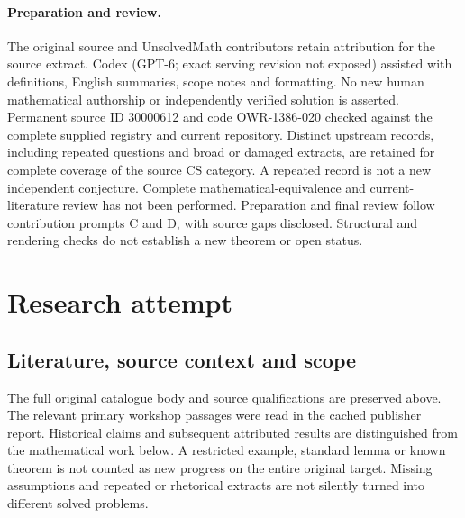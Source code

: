 \documentclass[11pt]{article}
\begin{document}
\paragraph{Preparation and review.}
The original source and UnsolvedMath contributors retain attribution for the source extract. Codex (GPT-6; exact serving revision not exposed) assisted with definitions, English summaries, scope notes and formatting. No new human mathematical authorship or independently verified solution is asserted. Permanent source ID 30000612 and code OWR-1386-020 checked against the complete supplied registry and current repository. Distinct upstream records, including repeated questions and broad or damaged extracts, are retained for complete coverage of the source CS category. A repeated record is not a new independent conjecture. Complete mathematical-equivalence and current-literature review has not been performed. Preparation and final review follow contribution prompts C and D, with source gaps disclosed. Structural and rendering checks do not establish a new theorem or open status.
\label{end:30000612}

\section{Research attempt}
\subsection{Literature, source context and scope}
The full original catalogue body and source qualifications are preserved above. The relevant primary workshop passages were read in the cached publisher report. Historical claims and subsequent attributed results are distinguished from the mathematical work below. A restricted example, standard lemma or known theorem is not counted as new progress on the entire original target. Missing assumptions and repeated or rhetorical extracts are not silently turned into different solved problems.
\end{document}
